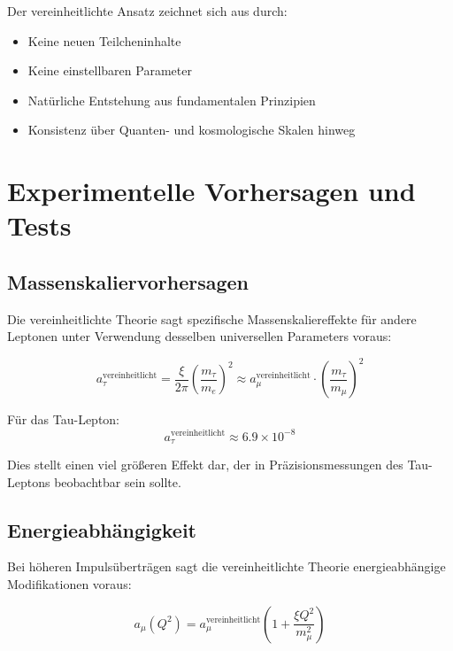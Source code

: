 \documentclass[12pt,a4paper]{article}
\newcommand{\xipar}{\xi}
\begin{document}
	Der vereinheitlichte Ansatz zeichnet sich aus durch:
	\begin{itemize}
		\item Keine neuen Teilcheninhalte
		\item Keine einstellbaren Parameter
		\item Natürliche Entstehung aus fundamentalen Prinzipien
		\item Konsistenz über Quanten- und kosmologische Skalen hinweg
	\end{itemize}
	
	\section{Experimentelle Vorhersagen und Tests}
	
	\subsection{Massenskaliervorhersagen}
	\label{subsec:mass_scaling}
	
	Die vereinheitlichte Theorie sagt spezifische Massenskaliereffekte für andere Leptonen unter Verwendung desselben universellen Parameters voraus:
	
	\begin{equation}
		a_\tau^{\text{vereinheitlicht}} = \frac{\xipar}{2\pi}\left(\frac{m_\tau}{m_e}\right)^2 \approx a_\mu^{\text{vereinheitlicht}} \cdot \left(\frac{m_\tau}{m_\mu}\right)^2
	\end{equation}
	
	Für das Tau-Lepton:
	\begin{equation}
		a_\tau^{\text{vereinheitlicht}} \approx 6.9 \times 10^{-8}
	\end{equation}
	
	Dies stellt einen viel größeren Effekt dar, der in Präzisionsmessungen des Tau-Leptons beobachtbar sein sollte.
	
	\subsection{Energieabhängigkeit}
	\label{subsec:energy_dependence}
	
	Bei höheren Impulsüberträgen sagt die vereinheitlichte Theorie energieabhängige Modifikationen voraus:
	
	\begin{equation}
		a_\mu(Q^2) = a_\mu^{\text{vereinheitlicht}} \left(1 + \frac{\xipar Q^2}{m_\mu^2}\right)
	\end{equation}
	
\end{document}
